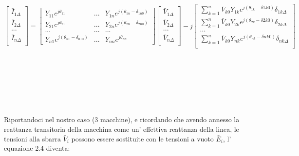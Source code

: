 \documentclass[Lau,noexaminfo]{sapthesis}
\begin{document}
	\begin{equation}
	\begin{bmatrix}
	\bar{I}_{1\Delta}\\
	\bar{I}_{2\Delta}\\
	...\\
	\bar{I}_{n\Delta}\\
	\end{bmatrix}=
	\begin{bmatrix}
	Y_{11}e^{j\theta_{11}} & ... & Y_{1n}e^{j(\theta_{1n}-\delta_{1n0})}\\
	Y_{21}e^{j\theta_{21}} & ... & Y_{2n}e^{j(\theta_{2n}-\delta_{2n0})}\\
	... & ... & ...\\
	Y_{n1}e^{j(\theta_{n1}-\delta_{n10})} & ... & Y_{nn}e^{j\theta_{nn}}
	\end{bmatrix}
	\begin{bmatrix}
	\bar{V}_{1\Delta}\\
	\bar{V}_{2\Delta}\\
	...\\
	\bar{V}_{n\Delta}\\
	\end{bmatrix}-j
	\begin{bmatrix}
	\sum_{k=1}^{n}\bar{V}_{k0}Y_{1k}e^{j(\theta_{1k}-\delta{1k0})}\delta_{1k\Delta}\\
	\sum_{k=1}^{n}\bar{V}_{k0}Y_{2k}e^{j(\theta_{2k}-\delta{2k0})}\delta_{2k\Delta}\\
	...\\
	\sum_{k=1}^{n}\bar{V}_{k0}Y_{nk}e^{j(\theta_{nk}-\delta{nk0})}\delta_{nk\Delta}\\
	\end{bmatrix}
	\end{equation}\\\\\\\\\\\\\\
	Riportandoci nel nostro caso (3 macchine), e ricordando che avendo annesso la reattanza transitoria della macchina come un' effettiva reattanza della linea, le tensioni alla sbarra $\bar{V}_i$ possono essere sostituite con le tensioni a vuoto $\bar{E}_i$, l' equazione 2.4 diventa:\\
\end{document}
